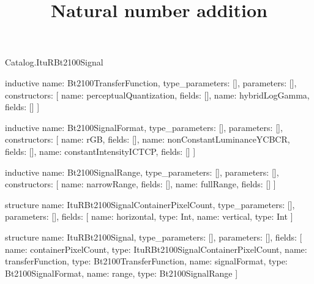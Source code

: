 \begin{lexlean}{Catalog.ItuRBt2100Signal}
\title{Natural number addition}
\begin{semanticmodule}
inductive{
  name: Bt2100TransferFunction,
  type_parameters: [],
  parameters: [],
  constructors: [
    {name: perceptualQuantization, fields: []},
    {name: hybridLogGamma, fields: []}
  ]
}

inductive{
  name: Bt2100SignalFormat,
  type_parameters: [],
  parameters: [],
  constructors: [
    {name: rGB, fields: []},
    {name: nonConstantLuminanceYCBCR, fields: []},
    {name: constantIntensityICTCP, fields: []}
  ]
}

inductive{
  name: Bt2100SignalRange,
  type_parameters: [],
  parameters: [],
  constructors: [
    {name: narrowRange, fields: []},
    {name: fullRange, fields: []}
  ]
}

structure{
  name: ItuRBt2100SignalContainerPixelCount,
  type_parameters: [],
  parameters: [],
  fields: [
    {name: horizontal, type: Int},
    {name: vertical, type: Int}
  ]
}

structure{
  name: ItuRBt2100Signal,
  type_parameters: [],
  parameters: [],
  fields: [
    {name: containerPixelCount, type: ItuRBt2100SignalContainerPixelCount},
    {name: transferFunction, type: Bt2100TransferFunction},
    {name: signalFormat, type: Bt2100SignalFormat},
    {name: range, type: Bt2100SignalRange}
  ]
}
\end{semanticmodule}
\end{lexlean}
